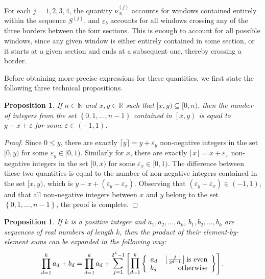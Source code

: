 \documentclass[11pt,a4paper]{tesis}
\theoremstyle{plain}
\newtheorem{proposition}[theorem]{Proposition}
\theoremstyle{definition}
\begin{document}
For each $j = 1, 2, 3, 4$, the quantity $\nu^{(j)}_N$ accounts for windows contained entirely within the sequence $S^{(j)}$, and $\varepsilon_b$ accounts for all windows crossing any of the three borders between the four sections. This is enough to account for all possible windows, since any given window is either entirely contained in some section, or it starts at a given section and ends at a subsequent one, thereby crossing a border.

Before obtaining more precise expressions for these quantities, we first state the following three technical propositions.

\begin{proposition}\label{proposition:inequality-sandwich}
  If $n \in \mathbb{N}$ and $x, y \in \mathbb{R}$ such that $[x, y) \subseteq [0, n)$, then the number of integers from the set $\left \{ 0, 1, \dots, n - 1 \right \}$ contained in $\left[x, y\right)$ is equal to $y - x + \varepsilon$ for some $\varepsilon \in (-1, 1)$.
\end{proposition}

\begin{proof}
  Since $0 \le y$, there are exactly $\lceil y \rceil = y + \varepsilon_y$ non-negative integers in the set $[0, y)$ for some $\varepsilon_y \in [0, 1)$. Similarly for $x$, there are exactly $\lceil x \rceil = x + \varepsilon_x$ non-negative integers in the set $[0, x)$ for some $\varepsilon_x \in [0, 1)$. The difference between these two quantities is equal to the number of non-negative integers contained in the set $[x, y)$, which is $y - x + (\varepsilon_y - \varepsilon_x)$. Observing that $(\varepsilon_y - \varepsilon_x) \in (-1, 1)$, and that all non-negative integers between $x$ and $y$ belong to the set $\left \{ 0, 1, \dots, n - 1 \right \}$, the proof is complete.
\end{proof}

\begin{proposition}\label{proposition:product-of-sums}
  If $k$ is a positive integer and $a_1, a_2, \dots, a_k$, $b_1, b_2, \dots, b_k$ are sequences of real numbers of length $k$, then the product of their element-by-element sums can be expanded in the following way:
  \begin{equation*}
    \prod_{d = 1}^{k} a_d + b_d = \prod_{d = 1}^{k} a_d + \mathlarger{\sum}_{j = 1}^{2^k - 1} \left [ \mathlarger{\prod}_{d = 1}^{k}
      \left \{ \begin{array}{lr}
        a_d & \left\lfloor \frac{j}{2^{d - 1}} \right\rfloor \text{is even} \\
        b_d & \text{otherwise}
      \end{array} \right \} \right ] \text{.}
  \end{equation*}
\end{proposition}
\end{document}
